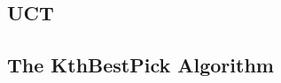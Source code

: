 \documentclass[letterpaper]{article}
\numberwithin{equation}{section}
\numberwithin{theorem}{section}
\numberwithin{lemma}{section}
\numberwithin{df}{section}
\begin{document}


\subsection{UCT}





\subsection{The KthBestPick Algorithm}
\label{sec:KthBestPick}
\end{document}
